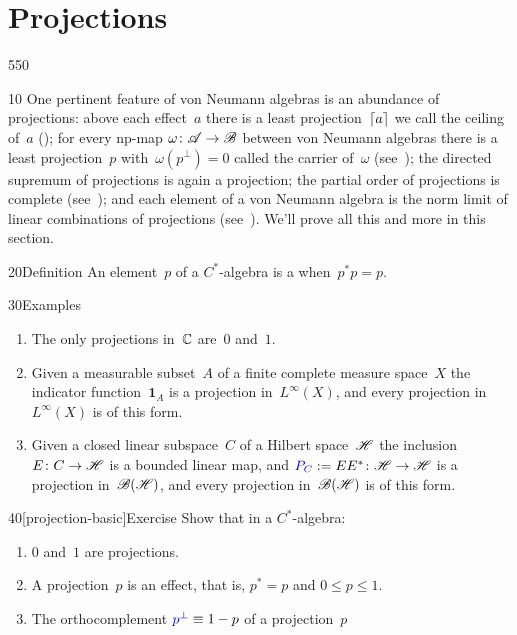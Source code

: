\section{Projections}
\begin{parsec}{550}%
\begin{point}{10}%
One pertinent feature
of von Neumann algebras
is an abundance of projections:
above each effect~$a$ 
there is a least projection~$\left\lceil a\right\rceil$
we call the ceiling of~$a$ ();
for every np-map $\omega\colon \mathscr{A}\to \mathscr{B}$
between von Neumann algebras
there is a least projection~$p$ with~$\omega(p^\perp)=0$
called the carrier of~$\omega$ (see~);
the directed supremum of projections is again a projection;
the partial order of projections is complete
(see~);
and each element of a von Neumann algebra is the norm limit
of linear combinations of projections
(see~).
We'll prove all this and more in this section.
\end{point}
\begin{point}{20}{Definition}%
An element~$p$ of a $C^*$-algebra
is a %
when~$p^*p=p$.
\end{point}
\begin{point}{30}{Examples}%
\begin{enumerate}
\item
The only projections in~$\mathbb{C}$ are~$0$ and~$1$.
\item
Given a measurable
subset~$A$ of a finite complete measure space~$X$
the indicator function~$\mathbf{1}_A$
is a projection in~$L^\infty(X)$,
and every projection in~$L^\infty(X)$
is of this form.
\item
Given a closed linear subspace~$C$ of a Hilbert space~$\mathscr{H}$
the inclusion $E\colon C\to \mathscr{H}$
is a bounded linear map,
and  $\Define{P_C}:=EE^*\colon \scrH\to\scrH$
is a projection in~$\mathscr{B}(\mathscr{H})$,
and
every projection in~$\mathscr{B}(\mathscr{H})$ is of this form.
\end{enumerate}
\spacingfix%
\end{point}
\begin{point}{40}[projection-basic]{Exercise}%
Show that in a $C^*$-algebra:
\begin{enumerate}
\item
$0$ and~$1$ are projections.
\item
A projection~$p$ is an effect,
that is, $p^*=p$
and $0\leq p\leq 1$.
\item
    The orthocomplement $\Define{p^\perp} \equiv 1-p$ of a projection~$p$

\end{enumerate}
\end{point}
\end{parsec}
